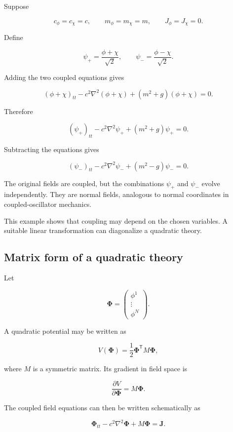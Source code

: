 Suppose

\[
c_{\phi}=c_{\chi}=c,
\qquad
m_{\phi}=m_{\chi}=m,
\qquad
J_{\phi}=J_{\chi}=0.
\]

Define

\[
\psi_{+}
=
\frac{\phi+\chi}{\sqrt{2}},
\qquad
\psi_{-}
=
\frac{\phi-\chi}{\sqrt{2}}.
\]

Adding the two coupled equations gives

\[
(\phi+\chi)_{tt}
-
c^{2}\nabla^{2}(\phi+\chi)
+
(m^{2}+g)(\phi+\chi)
=0.
\]

Therefore

\[
\boxed{
(\psi_{+})_{tt}
-
c^{2}\nabla^{2}\psi_{+}
+
(m^{2}+g)\psi_{+}
=0
}.
\]

Subtracting the equations gives

\[
\boxed{
(\psi_{-})_{tt}
-
c^{2}\nabla^{2}\psi_{-}
+
(m^{2}-g)\psi_{-}
=0
}.
\]

The original fields are coupled, but the combinations \(\psi_{+}\) and \(\psi_{-}\) evolve independently. They are normal fields, analogous to normal coordinates in coupled-oscillator mechanics.

This example shows that coupling may depend on the chosen variables. A suitable linear transformation can diagonalize a quadratic theory.

\subsection{Matrix form of a quadratic theory}

Let

\[
\boldsymbol{\Phi}
=
\begin{pmatrix}
\phi^{1}\\
\vdots\\
\phi^{N}
\end{pmatrix}.
\]

A quadratic potential may be written as

\[
V(\boldsymbol{\Phi})
=
\frac{1}{2}
\boldsymbol{\Phi}^{\mathsf{T}}
M
\boldsymbol{\Phi},
\]

where \(M\) is a symmetric matrix. Its gradient in field space is

\[
\frac{\partial V}{\partial\boldsymbol{\Phi}}
=
M\boldsymbol{\Phi}.
\]

The coupled field equations can then be written schematically as

\[
\boldsymbol{\Phi}_{tt}
-
c^{2}\nabla^{2}\boldsymbol{\Phi}
+
M\boldsymbol{\Phi}
=
\mathbf{J}.
\]

